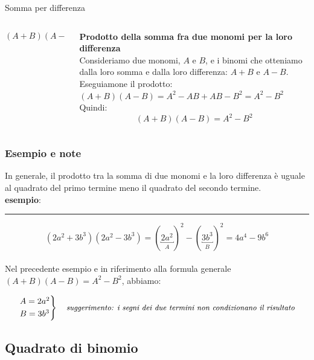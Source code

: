 \documentclass[10pt, aspectratio=169]{beamer}
\begin{document}
\begin{frame}{Somma per differenza}
    \begin{columns}
        
        \begin{column}{0.5\textwidth}
            \Large{$$ (A+B)(A-B) = A^2 - B^2$$}
        \end{column}

        \begin{column}{0.5\textwidth}
        {\textbf{Prodotto della somma fra due monomi per la loro differenza}}\\[10pt]

        \small{Consideriamo due monomi, $A$ e $B$, e i binomi che otteniamo dalla loro somma e dalla loro differenza: $A+B$ e $A-B$.\\
        Eseguiamone il prodotto: $(A+B)(A-B)=A^2-A B+A B-B^2=A^2-B^2$\\ [10pt]
        Quindi:}
$$
(A+B)(A-B)=A^2-B^2
$$

        \end{column}
    \end{columns}
\end{frame}

\begin{frame}
    \frametitle{Esempio e note}

    In generale, il prodotto tra la somma di due monomi e la loro differenza è uguale al quadrato del primo termine meno il quadrato del secondo termine. \\[10pt]
\textbf{esempio}:
\hrule

$$\left(2 a^2+3 b^3\right)\left(2 a^2-3 b^3\right)=(\underbracket{2 a^2}_{A})^2- (\underbracket{3 b^3}_{B})^2=4 a^4-9 b^6$$\\[10pt]

Nel precedente esempio e in riferimento alla formula generale $(A+B)(A-B)=A^2-B^2$, abbiamo:

\[
\begin{rcases*}
    A = 2a^2\\
    B= 3b^3
\end{rcases*} \quad \small{\textit{suggerimento: i segni dei due termini non condizionano il risultato}} 
\]


\end{frame}



\subsection{Quadrato di binomio}
\end{document}
